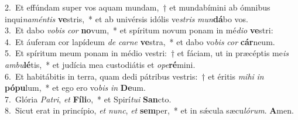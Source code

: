 {2.~}Et effúndam super vos aquam mundam,~† et mundabímini ab ómnibus inqui\textit{na}\textit{mén}\textit{tis} \textbf{ve}stris,~* et ab univérsis idólis ve\textit{stris} \textit{mun}\textbf{dá}bo vos.\\
{3.~}Et dabo \textit{vo}\textit{bis} \textit{cor} \textbf{no}vum,~* et spíritum novum ponam in mé\textit{di}\textit{o} \textbf{ve}stri:\\
{4.~}Et áuferam cor lapídeum \textit{de} \textit{car}\textit{ne} \textbf{ve}stra,~* et dabo vo\textit{bis} \textit{cor} \textbf{cár}neum.\\
{5.~}Et spíritum meum ponam in médio vestri:~† et fáciam, ut in præcéptis me\textit{is} \textit{am}\textit{bu}\textbf{lé}tis,~* et judícia mea custodiátis et \textit{o}\textit{pe}\textbf{ré}mini.\\
{6.~}Et habitábitis in terra, quam dedi pátribus vestris:~† et éritis \textit{mi}\textit{hi} \textit{in} \textbf{pó}\textbf{pu}lum,~* et ego ero vo\textit{bis} \textit{in} \textbf{De}um.\\
{7.~}Glória \textit{Pa}\textit{tri}, \textit{et} \textbf{Fí}\textbf{li}o,~* et Spirí\textit{tu}\textit{i} \textbf{San}cto.\\
{8.~}Sicut erat in princípio, \textit{et} \textit{nunc}, \textit{et} \textbf{sem}per,~* et in sǽcula sæcu\textit{ló}\textit{rum}. \textbf{A}men.\\
